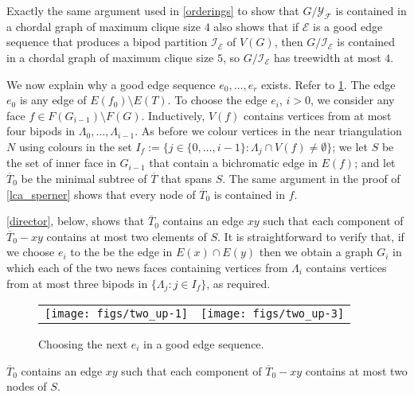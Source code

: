 \documentclass{patmorin}
\begin{document}
Exactly the same argument used in \cref{orderings} to show that $G/\mathcal{Y_F}$ is contained in a chordal graph of maximum clique size $4$ also shows that if $\mathcal{E}$ is a good edge sequence that produces a bipod partition $\mathcal{I_E}$ of $V(G)$, then $G/\mathcal{I_E}$ is contained in a chordal graph of maximum clique size $5$, so $G/\mathcal{I_E}$ has treewidth at most $4$.

We now explain why a good edge sequence $e_0,\ldots,e_r$ exists.  Refer to \cref{e_i}. The edge $e_0$ is any edge of $E(f_0)\setminus E(T)$.  To choose the edge $e_i$, $i>0$, we consider any face $f\in F(G_{i-1})\setminus F(G)$. Inductively, $V(f)$ contains vertices from at most four bipods in $\Lambda_0,\ldots,\Lambda_{i-1}$.  As before we colour vertices in the near triangulation $N$ using colours in the set $I_f:=\{j\in\{0,\ldots,i-1\}:\Lambda_j\cap V(f)\neq\emptyset\}$; we let $S$ be the set of inner face in $G_{i-1}$ that contain a bichromatic edge in $E(f)$; and let $\overline{T}_0$ be the minimal subtree of $\overline{T}$ that spans $S$.  The same argument in the proof of \cref{lca_sperner} shows that every node of $\overline{T}_0$ is contained in $f$.

\cref{director}, below, shows that $\overline{T}_0$ contains an edge $xy$ such that each component of $\overline{T}_0-xy$ contains at most two elements of $S$.  It is straightforward to verify that, if we choose $e_i$ to the be the edge in $E(x)\cap E(y)$ then we obtain a graph $G_i$ in which each of the two news faces containing vertices from $\Lambda_i$ contains vertices from at most three bipods in $\{\Lambda_j:j\in I_f\}$, as required.

\begin{figure}[htbp]
  \begin{center}
    \begin{tabular}{cc}
       \texttt{[image: figs/two\_up-1]} &
       \texttt{[image: figs/two\_up-3]}
     \end{tabular}
  \end{center}
  \caption{Choosing the next $e_i$ in a  good edge sequence.}
  \label{e_i}
\end{figure}

\begin{clm}\label{director}
  $\overline{T}_0$ contains an edge $xy$ such that each component of $\overline{T}_0-xy$ contains at most two nodes of $S$.
\end{clm}
\end{document}
